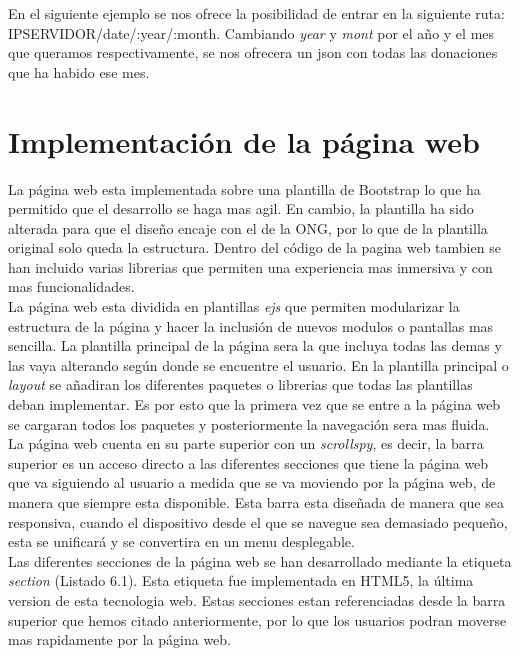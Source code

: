 En el siguiente ejemplo se nos ofrece la posibilidad de entrar en la siguiente ruta: IPSERVIDOR/date/:year/:month. Cambiando \textit{year} y \textit{mont} por el año y el mes que queramos respectivamente, se nos ofrecera un json con todas las donaciones que ha habido ese mes.


\section{Implementación de la página web}
La página web esta implementada sobre una plantilla de Bootstrap lo que ha permitido que el desarrollo se haga mas agil. En cambio, la plantilla ha sido alterada para que el diseño encaje con el de la ONG, por lo que de la plantilla original solo queda la estructura. Dentro del código de la pagina web tambien se han incluido varias librerias que permiten una experiencia mas inmersiva y con mas funcionalidades. \\

La página web esta dividida en plantillas \textit{ejs} que permiten modularizar la estructura de la página y hacer la inclusión de nuevos modulos o pantallas mas sencilla. La plantilla principal de la página sera la que incluya todas las demas y las vaya alterando según donde se encuentre el usuario. En la plantilla principal o \textit{layout} se añadiran los diferentes paquetes o librerias que todas las plantillas deban implementar. Es por esto que la primera vez que se entre a la página web se cargaran todos los paquetes y posteriormente la navegación sera mas fluida.\\

La página web cuenta en su parte superior con un \textit{scrollspy}, es decir, la barra superior es un acceso directo a las diferentes secciones que tiene la página web que va siguiendo al usuario a medida que se va moviendo por la página web, de manera que siempre esta disponible. Esta barra esta diseñada de manera que sea responsiva, cuando el dispositivo desde el que se navegue sea demasiado pequeño, esta se unificará y se convertira en un menu desplegable.\\

Las diferentes secciones de la página web se han desarrollado mediante la etiqueta \textit{section} (Listado 6.1). Esta etiqueta fue implementada en HTML5, la última version de esta tecnologia web. Estas secciones estan referenciadas desde la barra superior que hemos citado anteriormente, por lo que los usuarios podran moverse mas rapidamente por la página web.\\



